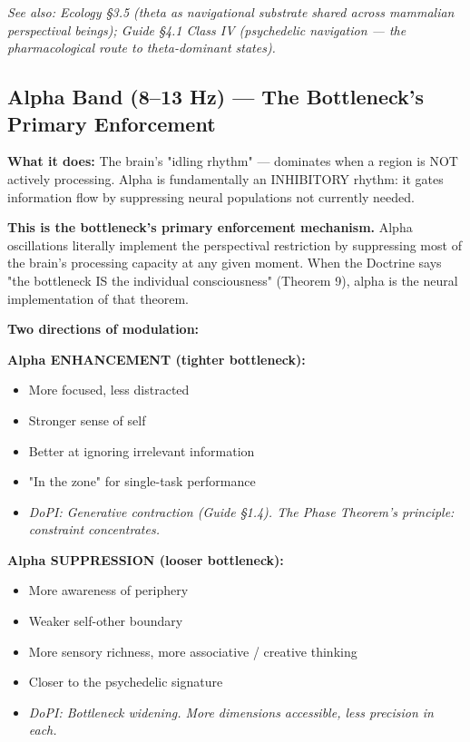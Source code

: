 \textit{See also: Ecology §3.5 (theta as navigational substrate shared across mammalian perspectival beings); Guide §4.1 Class IV (psychedelic navigation — the pharmacological route to theta-dominant states).}


\bigskip\noindent\makebox[\textwidth]{\color{rulegray}\rule{5cm}{0.3pt}}\bigskip


\subsection*{Alpha Band (8–13 Hz) — The Bottleneck's Primary Enforcement}


\textbf{What it does:} The brain's "idling rhythm" — dominates when a region is NOT actively processing. Alpha is fundamentally an INHIBITORY rhythm: it gates information flow by suppressing neural populations not currently needed.


\textbf{This is the bottleneck's primary enforcement mechanism.} Alpha oscillations literally implement the perspectival restriction by suppressing most of the brain's processing capacity at any given moment. When the Doctrine says "the bottleneck IS the individual consciousness" (Theorem 9), alpha is the neural implementation of that theorem.


\textbf{Two directions of modulation:}


\textbf{Alpha ENHANCEMENT (tighter bottleneck):}

\begin{itemize}[nosep,leftmargin=*]
  \item More focused, less distracted
  \item Stronger sense of self
  \item Better at ignoring irrelevant information
  \item "In the zone" for single-task performance
  \item \textit{DoPI: Generative contraction (Guide §1.4). The Phase Theorem's principle: constraint concentrates.}
\end{itemize}


\textbf{Alpha SUPPRESSION (looser bottleneck):}

\begin{itemize}[nosep,leftmargin=*]
  \item More awareness of periphery
  \item Weaker self-other boundary
  \item More sensory richness, more associative / creative thinking
  \item Closer to the psychedelic signature
  \item \textit{DoPI: Bottleneck widening. More dimensions accessible, less precision in each.}
\end{itemize}


